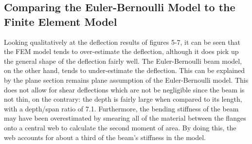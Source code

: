 \documentclass{article}
\begin{document}
\subsection{Comparing the Euler-Bernoulli Model to the Finite Element Model}

Looking qualitatively at the deflection results of figures 5-7, it can be seen that the FEM model tends to over-estimate the deflection, although it does pick up the general shape of the deflection fairly well. The Euler-Bernoulli beam model, on the other hand, tends to under-estimate the deflection. This can be explained by the plane section remains plane assumption of the Euler-Bernoulli model. This does not allow for shear deflections which are not be negligible since the beam is not thin, on the contrary: the depth is fairly large when compared to its length, with a depth/span ratio of 7.1. Furthermore, the bending stiffness of the beam may have been overestimated by smearing all of the material between the flanges onto a central web to calculate the second moment of area. By doing this, the web accounts for about a third of the beam's stiffness in the model.\\
\end{document}
